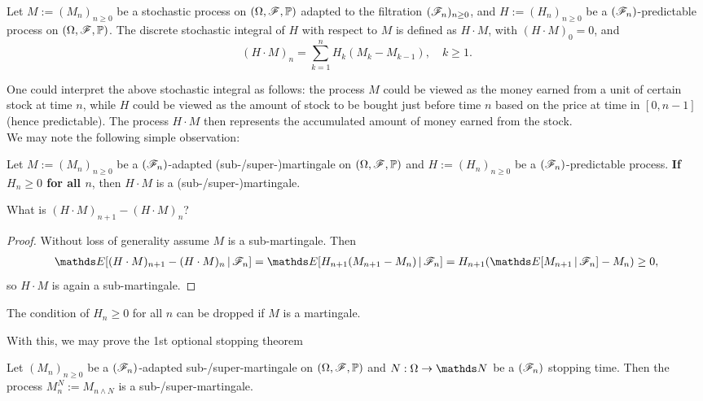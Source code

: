 \begin{definition}
Let $M := (M_n)_{n\geq 0}$ be a stochastic process on $(\Omega,\mathcal{F},\mathbb{P})$ adapted to the filtration $(\mathcal{F}_n)_{n\geq 0}$, and $H := (H_n)_{n\geq 0}$ be a $(\mathcal{F}_n)$-predictable process on $(\Omega,\mathcal{F},\mathbb{P})$. The discrete stochastic integral of $H$ with respect to $M$ is defined as $H \cdot M$, with $(H \cdot M)_0 = 0$, and 
\begin{equation}
    (H \cdot M)_n = \sum_{k=1}^n H_k (M_k - M_{k-1}), \quad k \geq 1.
\end{equation}
\end{definition}

One could interpret the above stochastic integral as follows: the process $M$ could be viewed as the money earned from a unit of certain stock at time $n$, while $H$ could be viewed as the amount of stock to be bought just before time $n$ based on the price at time in $[0,n-1]$ (hence predictable). The process $H \cdot M$ then represents the accumulated amount of money earned from the stock.\\

We may note the following simple observation:
\begin{proposition} \label{prop:stochastic_integral_martingale}
Let $M := (M_n)_{n\geq 0}$ be a $(\mathcal{F}_n)$-adapted (sub-/super-)martingale on $(\Omega,\mathcal{F},\mathbb{P})$ and $H := (H_n)_{n\geq 0}$ be a $(\mathcal{F}_n)$-predictable process. \textbf{If $H_n \geq 0$ for all $n$}, then $H \cdot M$ is a (sub-/super-)martingale.
\end{proposition}

\begin{hint}
    What is $(H \cdot M)_{n+1} - (H \cdot M)_n$?
\end{hint}

\begin{proof}
Without loss of generality assume $M$ is a sub-martingale. Then
\begin{align*}
    \E[(H \cdot M)_{n+1} - (H \cdot M)_n \,|\, \F_n] = \E[H_{n+1} (M_{n+1} - M_n) \,|\, \F_n] = H_{n+1} (\E[M_{n+1} \,|\, \F_n] - M_n) \geq 0,
\end{align*}
so $H \cdot M$ is again a sub-martingale.
\end{proof}

\begin{remark}
The condition of $H_n \geq 0$ for all $n$ can be dropped if $M$ is a martingale.
\end{remark}

With this, we may prove the 1st optional stopping theorem
\begin{theorem}
Let ${(M_n)}_{n\geq 0}$ be a $(\mathcal{F}_n)$-adapted sub-/super-martingale on $(\Omega,\mathcal{F},\mathbb{P})$ and $N:\Omega \to \N$ be a $(\mathcal{F}_n)$ stopping time. Then the process $M_n^N := M_{n \wedge N}$ is a sub-/super-martingale.
\end{theorem}

